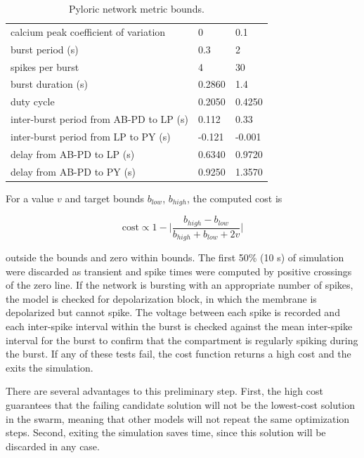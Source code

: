 \begin{table}[h]
	\myfloatalign
	\begin{tabularx}{\textwidth}{lll} \toprule
		\tableheadline{Metric} & \tableheadline{Lower} & \tableheadline{Upper} \\ \midrule
		calcium peak coefficient of variation & 0 & 0.1 \\
		burst period (s) & 0.3 & 2 \\
		spikes per burst & 4 & 30 \\
		burst duration (s) & 0.2860 & 1.4 \\
		duty cycle & 0.2050 & 0.4250 \\
		inter-burst period from \acs{AB}-\acs{PD} to \acs{LP} (s) & 0.112 & 0.33 \\
		inter-burst period from \acs{LP} to \acs{PY} (s) & -0.121 & -0.001 \\
		delay from \acs{AB}-\acs{PD} to \acs{LP} (s) & 0.6340 & 0.9720 \\
		delay from \acs{AB}-\acs{PD} to \acs{PY} (s) & 0.9250 & 1.3570 \\
		\bottomrule
	\end{tabularx}
	\caption[Pyloric network metric bounds]{Pyloric network metric bounds.}  
	\label{tab:metricsbounds}
\end{table}

For a value $v$ and target bounds $b_{low}$, $b_{high}$, the computed cost is

\begin{equation}
	\mathrm{cost} \propto 1 - \Bigg| \frac{b_{high} - b_{low}}{b_{high} + b_{low} + 2v} \Bigg|
\end{equation}

outside the bounds and zero within bounds. The first 50\% (10 s) of simulation were discarded as transient and spike times were computed by positive crossings of the zero line. If the network is bursting with an appropriate number of spikes, the model is checked for depolarization block, in which the membrane is depolarized but cannot spike. The voltage between each spike is recorded and each inter-spike interval within the burst is checked against the mean inter-spike interval for the burst to confirm that the compartment is regularly spiking during the burst. If any of these tests fail, the cost function returns a high cost and the exits the simulation.

There are several advantages to this preliminary step. First, the high cost guarantees that the failing candidate solution will not be the lowest-cost solution in the swarm, meaning that other models will not repeat the same optimization steps. Second, exiting the simulation saves time, since this solution will be discarded in any case.

